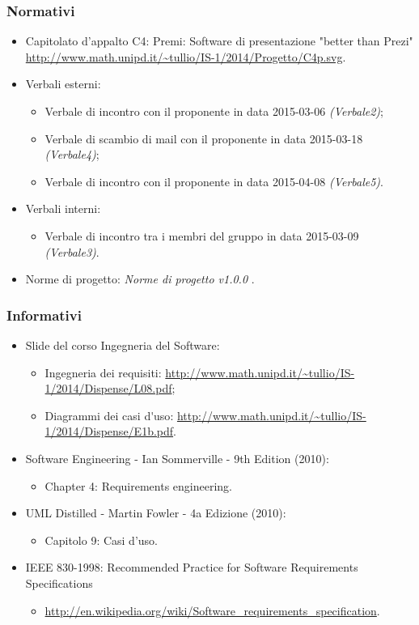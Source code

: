 \subsubsection{Normativi}
\begin{itemize}
	\item Capitolato d'appalto C4: Premi: Software di presentazione "better than Prezi"
	\newline \url{http://www.math.unipd.it/~tullio/IS-1/2014/Progetto/C4p.svg}.
	\item Verbali esterni:
	\begin{itemize}
		\item \gls{Verbale} di incontro con il proponente in data 2015-03-06 \textit{(Verbale2)};
		\item \gls{Verbale} di scambio di mail con il proponente in data 2015-03-18 \textit{(Verbale4)};
		\item \gls{Verbale} di incontro con il proponente in data 2015-04-08 \textit{(Verbale5)}.
	\end{itemize}
	\item Verbali interni:
	\begin{itemize}
		\item \gls{Verbale} di incontro tra i membri del gruppo in data 2015-03-09 \textit{(Verbale3)}.
	\end{itemize}
	\item Norme di progetto: \textit{Norme di progetto v1.0.0} .
\end{itemize}
\subsubsection{Informativi}
\begin{itemize}
	\item \gls{Slide} del corso Ingegneria del Software:
	\begin{itemize}
		\item Ingegneria dei requisiti: \url{http://www.math.unipd.it/~tullio/IS-1/2014/Dispense/L08.pdf};
		\item Diagrammi dei \gls{casi d'uso}: \url{http://www.math.unipd.it/~tullio/IS-1/2014/Dispense/E1b.pdf}.
	\end{itemize}
	\item Software Engineering - Ian Sommerville - 9th Edition (2010):
	\begin{itemize}
		\item Chapter 4: Requirements engineering.
	\end{itemize}
	\item \gls{UML} Distilled - Martin Fowler - 4a Edizione (2010):
	\begin{itemize}
		\item Capitolo 9: Casi d’uso.
	\end{itemize}
	\item IEEE 830-1998: Recommended Practice for Software Requirements Specifications
	\begin{itemize}
		\item \url{http://en.wikipedia.org/wiki/Software_requirements_specification}.
	\end{itemize}
\end{itemize}

